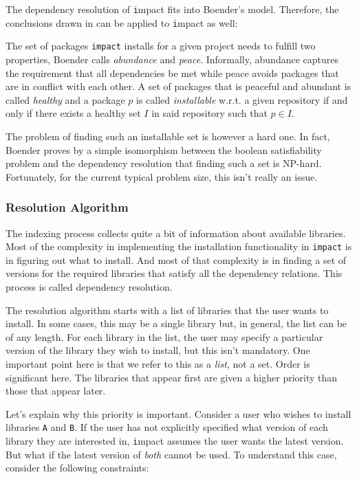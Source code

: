 \documentclass[11pt,a4paper,twocolumn]{article}
\newcommand{\impact}{\texttt{impact}} %
\newcommand{\code}[1]{\texttt{#1}} %
\begin{document}
The dependency resolution of {\code impact} fits into Boender's model.
Therefore, the conclusions drawn in \cite{boender2011formal} can be
applied to {\code impact} as well:

The set of packages {\impact} installs for a given project needs to
fulfill two properties, Boender calls {\em abundance} and {\em peace}.
Informally, abundance captures the requirement that all dependencies
be met while peace avoids packages that are in conflict with each
other.  A set of packages that is peaceful and abundant is called {\em
  healthy} and a package $p$ is called {\em installable} w.r.t. a
given repository if and only if there exists a healthy set $I$ in said
repository such that $p \in I$.

The problem of finding such an installable set is however a hard one.
In fact, Boender proves by a simple isomorphism between the boolean
satisfiability problem and the dependency resolution that finding such
a set is NP-hard.  Fortunately, for the current typical problem size,
this isn't really an issue.

\subsubsection{Resolution Algorithm}

The indexing process collects quite a bit of information about
available libraries.  Most of the complexity in implementing the
installation functionality in \code{impact} is in figuring out {\be
  what} to install.  And most of that complexity is in finding a set
of versions for the required libraries that satisfy all the dependency
relations.  This process is called dependency resolution.

The resolution algorithm starts with a list of libraries that the user
wants to install.  In some cases, this may be a single library but, in
general, the list can be of any length.  For each library in the list,
the user may specify a particular version of the library they wish to
install, but this isn't mandatory.  One important point here is that
we refer to this as a {\em list}, not a set.  Order is significant
here.  The libraries that appear first are given a higher priority
than those that appear later.

Let's explain why this priority is important.  Consider a user who
wishes to install libraries {\code A} and {\code B}.  If the user has
not explicitly specified what version of each library they are
interested in, {\code impact} assumes the user wants the latest
version.  But what if the latest version of {\em both} cannot be
used.  To understand this case, consider the following constraints:
\end{document}
